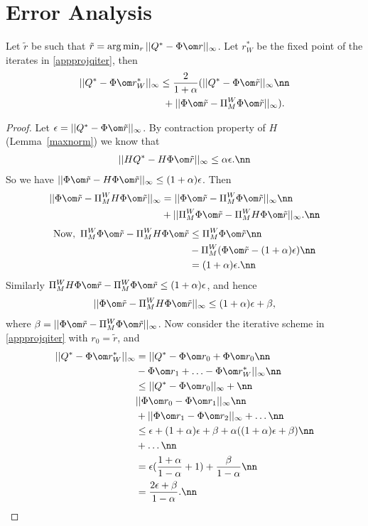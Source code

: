 \section{Error Analysis}
\begin{theorem}\label{eboundapp}
Let $\tilde{r}$ be such that $\tilde{r}=\arg\min_r||Q^*-\Phi\om r||_\infty$. Let $r^*_W$ be the fixed point of the iterates in \eqref{appprojqiter}, then
\begin{align}
||Q^*-\Phi\om r^*_W||_\infty&\leq \frac{2}{1+\alpha}(||Q^*-\Phi\om \tilde{r}||_\infty\nn\\&\mbox{  }+||\Phi\om \tilde{r}-\Pi_M^W \Phi\om \tilde{r}||_\infty).
\end{align}
\end{theorem} 
\begin{proof}
Let $\epsilon=||Q^*-\Phi\om\tilde{r}||_\infty$. By contraction property of $H$ (Lemma~\ref{maxnorm}) we know that
\begin{align}
||HQ^*-H\Phi\om \tilde{r}||_\infty\leq \alpha \epsilon. \nn
\end{align}
So we have $||\Phi\om\tilde{r}-H\Phi\om\tilde{r}||_\infty\leq (1+\alpha)\epsilon$. Then
\begin{align}
||\Phi\om\tilde{r}-\Pi^W_M H\Phi \om \tilde{r}||_\infty&=||\Phi\om\tilde{r}-\Pi^W_M \Phi \om \tilde{r}||_\infty\nn\\&+||\Pi^W_M\Phi\om\tilde{r}-\Pi^W_M H\Phi \om \tilde{r}||_\infty.\nn
\end{align}
\begin{align}
\text{Now},\mbox{ }\Pi^W_M \Phi\om\tilde{r}-\Pi^W_M H\Phi \om \tilde{r}&\leq\Pi^W_M \Phi\om\tilde{r}\nn\\&-\Pi^W_M (\Phi \om \tilde{r}-(1+\alpha)\epsilon)\nn\\
&=(1+\alpha)\epsilon.\nn
\end{align}
Similarly $\Pi^W_M H\Phi \om \tilde{r}-\Pi^W_M\Phi\om\tilde{r}\leq (1+\alpha)\epsilon$, and hence 
\begin{align}
||\Phi\om\tilde{r}-\Pi^W_M H\Phi \om \tilde{r}||_\infty\leq (1+\alpha)\epsilon+\beta,
\end{align}
where $\beta=||\Phi\om\tilde{r}-\Pi^W_M \Phi \om \tilde{r}||_\infty$. 
Now consider the iterative scheme in \eqref{appprojqiter} with $r_0=\tilde{r}$, and 
\begin{align}
||Q^*-\Phi\om r^*_W||_\infty&=||Q^*-\Phi\om r_0+\Phi\om r_0\nn\\&-\Phi\om r_1+\ldots-\Phi\om r^*_W||_\infty\nn\\
&\leq ||Q^*-\Phi\om r_0||_\infty+\nn\\&||\Phi\om r_0-\Phi\om r_1||_\infty\nn\\&+||\Phi\om r_1-\Phi\om r_2||_\infty+\ldots\nn\\
&\leq \epsilon+(1+\alpha)\epsilon+\beta+\alpha((1+\alpha)\epsilon+\beta)\nn\\
&+\ldots\nn\\
&=\epsilon(\frac{1+\alpha}{1-\alpha}+1)+\frac{\beta}{1-\alpha}\nn\\
&=\frac{2\epsilon+\beta}{1-\alpha}.\nn
\end{align}
\end{proof}
